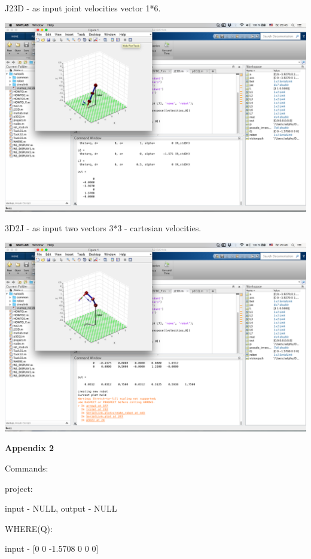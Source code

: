 \documentclass[12pt]{article}
\begin{document}
J23D - as input joint velocities vector 1*6. 

\begin{center}
  \includegraphics[width=15cm]{j23d}
\end{center}

3D2J - as input two vectors 3*3 - cartesian velocities.

\begin{center}
  \includegraphics[width=15cm]{p3d2j}
\end{center}

\newpage

\begin{center}
\textbf{Appendix 2}
\end{center}

Commands:

project:

input - NULL, output - NULL
	
WHERE(Q):

input - [0         0   -1.5708         0         0         0]
	
\end{document}
